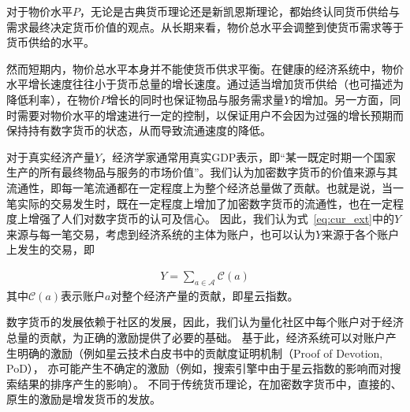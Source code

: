 
对于物价水平$P$，无论是古典货币理论还是新凯恩斯理论，都始终认同货币供给与需求最终决定货币价值的观点。从长期来看，物价总水平会调整到使货币需求等于货币供给的水平。

然而短期内，物价总水平本身并不能使货币供求平衡。在健康的经济系统中，物价水平增长速度往往小于货币总量的增长速度。通过适当增加货币供给（也可描述为降低利率），在物价$P$增长的同时也保证物品与服务需求量$Y$的增加。另一方面，同时需要对物价水平的增速进行一定的控制，以保证用户不会因为过强的增长预期而保持持有数字货币的状态，从而导致流通速度的降低。




对于真实经济产量$Y$，经济学家通常用真实GDP表示，即“某一既定时期一个国家生产的所有最终物品与服务的市场价值”。我们认为加密数字货币的价值来源与其流通性，即每一笔流通都在一定程度上为整个经济总量做了贡献。也就是说，当一笔实际的交易发生时，既在一定程度上增加了加密数字货币的流通性，也在一定程度上增强了人们对数字货币的认可及信心。
因此，我们认为式~\ref{eq:cur_ext}中的$Y$来源与每一笔交易，考虑到经济系统的主体为账户，也可以认为$Y$来源于各个账户上发生的交易，即

\begin{align}
Y=\sum_{a\in \mathcal{A}} \mathcal{C}(a)
\end{align}
\noindent 其中$\mathcal{C}(a)$表示账户$a$对整个经济产量的贡献，即星云指数。

数字货币的发展依赖于社区的发展，因此，我们认为量化社区中每个账户对于经济总量的贡献，为正确的激励提供了必要的基础。
基于此，经济系统可以对账户产生明确的激励（例如星云技术白皮书中的贡献度证明机制（Proof of Devotion, PoD），
亦可能产生不确定的激励（例如，搜索引擎中由于星云指数的影响而对搜索结果的排序产生的影响）。
不同于传统货币理论，在加密数字货币中，直接的、原生的激励是增发货币的发放。




